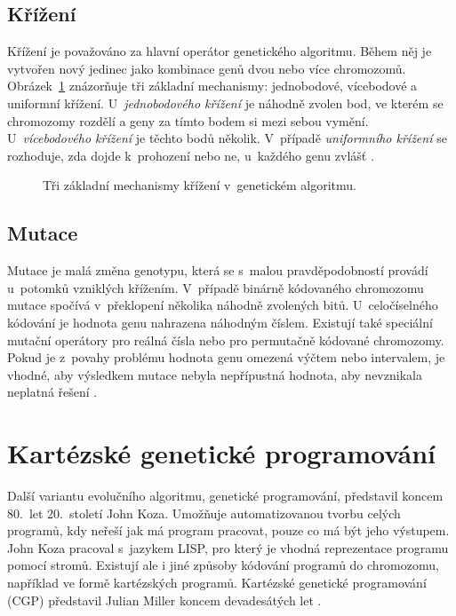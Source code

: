 \subsection{Křížení}

Křížení je považováno za hlavní operátor genetického algoritmu. Během něj je vytvořen nový jedinec jako kombinace genů dvou nebo více chromozomů. Obrázek~\ref{obrKrizeni} znázorňuje tři základní mechanismy: jednobodové, vícebodové a uniformní křížení. U~\emph{jednobodového křížení} je náhodně zvolen bod, ve kterém se chromozomy rozdělí a geny za tímto bodem si mezi sebou vymění. U~\emph{vícebodového křížení} je těchto bodů několik. V~případě \emph{uniformního křížení} se rozhoduje, zda dojde k~prohození nebo ne, u~každého genu zvlášť \cite{Modra}.

\begin{figure}[htb]
    \centering
    \hskip1.5cm
    \hskip1.5cm
    \caption{Tři základní mechanismy křížení v~genetickém algoritmu.}
    \label{obrKrizeni}
\end{figure}


\subsection{Mutace}

Mutace je malá změna genotypu, která se s~malou pravděpodobností provádí u~potomků vzniklých křížením. V~případě binárně kódovaného chromozomu mutace spočívá v~překlopení několika náhodně zvolených bitů. U~celočíselného kódování je hodnota genu nahrazena náhodným číslem. Existují také speciální mutační operátory pro reálná čísla nebo pro permutačně kódované chromozomy. Pokud je z~povahy problému hodnota genu omezená výčtem nebo intervalem, je vhodné, aby výsledkem mutace nebyla nepřípustná hodnota, aby nevznikala neplatná řešení \cite{Modra}.

\section{Kartézské genetické programování}
\label{secCGP}

Další variantu evolučního algoritmu, genetické programování, představil koncem 80.~let 20.~století John Koza. Umožňuje automatizovanou tvorbu celých programů, kdy neřeší jak má program pracovat, pouze co má být jeho výstupem. John Koza pracoval s~jazykem LISP, pro který je vhodná reprezentace programu pomocí stromů. Existují ale i jiné způsoby kódování programů do chromozomu, například ve formě kartézských programů. Kartézské genetické programování (CGP) představil Julian Miller koncem devadesátých let \cite{Miller2000}.

